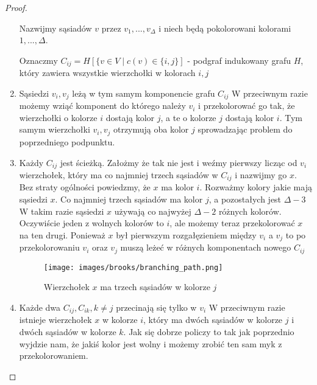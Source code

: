 \begin{proof}
\begin{enumerate}
                Nazwijmy sąsiadów $v$ przez $v_1, ..., v_\Delta$ i niech będą pokolorowani kolorami $1, ..., \Delta$.
                
                Oznaczmy $C_{ij} = H[\{v \in V \mid c(v) \in \{i, j\}]$ - podgraf indukowany
                grafu $H$, który zawiera wszystkie wierzchołki w kolorach $i, j$
                
            \item Sąsiedzi $v_i, v_j$ leżą w tym samym komponencie grafu $C_{ij}$ 
                W przeciwnym razie możemy wziąć komponent do którego należy $v_i$
                i przekolorować go tak, że wierzchołki o kolorze $i$ dostają kolor $j$,
                a te o kolorze $j$ dostają kolor $i$. Tym samym wierzchołki $v_i, v_j$
                otrzymują oba kolor $j$ sprowadzając problem do poprzedniego podpunktu.
                
            \item Każdy $C_{ij}$ jest ścieżką. 
                Założmy że tak nie jest i weźmy pierwszy licząc od $v_i$ wierzchołek, który ma co najmniej trzech sąsiadów w $C_{ij}$ i nazwijmy go $x$.
                Bez straty ogólności powiedzmy, że $x$ ma kolor $i$.
                Rozważmy kolory jakie mają sąsiedzi $x$.
                Co najmniej trzech sąsiadów ma kolor $j$, a pozostałych jest $\Delta - 3$
                W takim razie sąsiedzi $x$ używają co najwyżej $\Delta - 2$ różnych kolorów. Oczywiście jeden z wolnych kolorów to $i$, ale możemy teraz przekolorować $x$ na ten drugi.
                Ponieważ $x$ był pierwszym rozgałęzieniem między $v_i$ a $v_j$ 
                to po przekolorowaniu $v_i$ oraz $v_j$ muszą leżeć w różnych komponentach nowego $C_{ij}$ 
                
                \begin{figure}[ht]
                    \centering
                    \texttt{[image: images/brooks/branching\_path.png]}
                    \caption{Wierzchołek $x$ ma trzech sąsiadów w kolorze $j$}
                \end{figure}
                
            \item Każde dwa $C_{ij}, C_{ik}, k \neq j$ przecinają się tylko w $v_i$ 
                W przeciwnym razie istnieje wierzchołek $x$ w kolorze $i$,
                który ma dwóch sąsiadów w kolorze $j$ i dwóch sąsiadów w kolorze $k$.
                Jak się dobrze policzy to tak jak poprzednio wyjdzie nam, że jakiś kolor jest wolny i możemy zrobić ten sam myk z przekolorowaniem.
                

\end{enumerate}
\end{proof}
